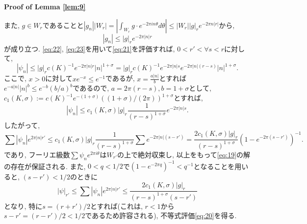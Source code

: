 \documentclass[a4paper]{ujarticle}
\makeatletter
\numberwithin{equation}{section}
\theoremstyle{definition}
\renewenvironment{proof}[1][Proof]{\par
  \pushQED{\qed}%
  \normalfont \topsep6\p@\@plus6\p@\relax
  \trivlist
  \item\relax
  {\bfseries
  #1\@addpunct{.}}\hspace\labelsep\ignorespaces
}{%
  \popQED\endtrivlist\@endpefalse
}
\makeatother
\begin{document}
\begin{proof}[Proof of Lemma \ref{lem:9}]
            また, $g \in W_r$であることと$\displaystyle |g_n| |W_r| = \left| \int_{W_r} g \cdot e^{-2 \pi i n \theta} d \theta \right| \leq |W_r| |g|_r e^{- 2 \pi n |r|}$から, 
            \begin{equation} \label{eq:23}
                |g_n| \leq |g|_r e^{- 2 \pi |n| r}
            \end{equation}
            が成り立つ. \eqref{eq:22}, \eqref{eq:23}を用いて\eqref{eq:21}を評価すれば,
            $0 < r' < \forall s < r$に対して,
            \begin{equation}
                |\psi_n| \leq |g|_r c(K)^{-1} e^{- 2 \pi |n| r} |n|^{1 + \sigma} = |g|_r c(K)^{-1} e^{- 2 \pi |n| s} e^{- 2 \pi |n| (r - s)} |n|^{1 + \sigma}.
            \end{equation}
            ここで, $x > 0$に対して$x e^{-x} \leq e^{-1}$であるが, $x = \frac{a |n|}{b}$とすれば$e^{-a |n|} |n|^{b} \leq e^{-b} (b/a)^{b}$であるので, 
            $a = 2 \pi (r - s), b = 1 + \sigma$として, $c_1(K, \sigma) := c(K)^{-1} e^{-(1 + \sigma)} ((1 + \sigma)/(2 \pi))^{1 + \sigma}$とすれば, 
            \[
                |\psi_n| \leq  c_1(K, \sigma) |g|_r \frac{1}{(r - s)^{1 + \sigma}} e^{- 2 \pi |n| s} .
            \]
            したがって, 
            \[
                \sum |\psi_n| e^{2 \pi |n| r'} \leq c_1(K, \sigma) |g|_r \frac{1}{(r - s)^{1 + \sigma}} \sum  e^{- 2 \pi |n| (s - r')} = \frac{2 c_1(K, \sigma) |g|_r}{(r - s)^{1 + \sigma}} (1 - e^{- 2 \pi (s - r')})^{-1}.
            \]
            であり, フーリエ級数$\sum \psi_n e^{2 \pi i \theta}$は$W_{r'}$の上で絶対収束し, 以上をもって\eqref{eq:19}の解の存在が保証される.
            また, $0 < q < 1/2$で$(1 - e^{- 2 \pi q})^{-1} < q^{-1}$となることを用いると, $(s - r') < 1/2$のときに
            \[
                |\psi|_{r'} \leq \sum |\psi_n| e^{2 \pi |n| r'} \leq \frac{2 c_1(K, \sigma) |g|_r}{(r - s)^{1 + \sigma}(s - r')} 
            \]
            となり, 特に$s = (r + r')/2$とすれば(これは, $r < 1$から$s - r' = (r - r')/2 < 1/2$であるため許容される), 不等式評価\eqref{eq:20}を得る.
        \end{proof}
\end{document}
